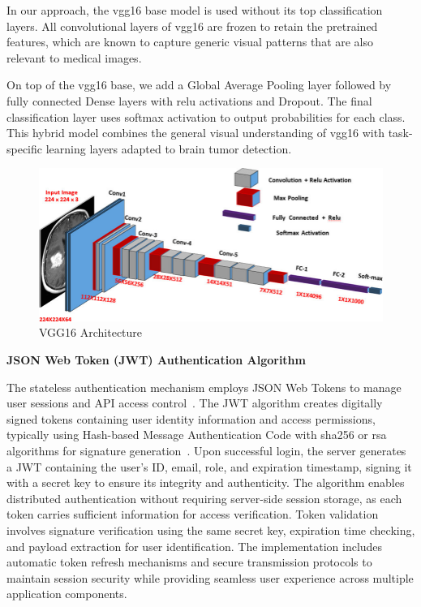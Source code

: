 In our approach, the \gls{vgg16} base model is used without its top
classification layers. All convolutional layers of \gls{vgg16} are frozen to
retain the pretrained features, which are known to capture generic visual
patterns that are also relevant to medical images.

On top of the \gls{vgg16} base, we add a Global Average Pooling layer followed
by fully connected Dense layers with \gls{relu} activations and Dropout. The
final classification layer uses softmax activation to output probabilities for
each class. This hybrid model combines the general visual understanding of
\gls{vgg16} with task-specific learning layers adapted to brain tumor
detection.

\begin{figure}[H]
    \centering
    \includegraphics[width=0.85\linewidth]{Images/vgg16.jpg}
    \caption{VGG16 Architecture}
    \label{fig:VGG16 Architecture}
\end{figure}

\textbf{JSON Web Token (JWT) Authentication Algorithm}

The stateless authentication mechanism employs JSON Web Tokens to manage user
sessions and API access control~\cite{jwtio_introduction}. The JWT algorithm
creates digitally signed tokens containing user identity information and access
permissions, typically using Hash-based Message Authentication Code with
\gls{sha256} or \gls{rsa} algorithms for signature
generation~\cite{jwtio_introduction}. Upon successful login, the server
generates a JWT containing the user's ID, email, role, and expiration
timestamp, signing it with a secret key to ensure its integrity and
authenticity. The algorithm enables distributed authentication without
requiring server-side session storage, as each token carries sufficient
information for access verification. Token validation involves signature
verification using the same secret key, expiration time checking, and payload
extraction for user identification. The implementation includes automatic token
refresh mechanisms and secure transmission protocols to maintain session
security while providing seamless user experience across multiple application
components.

